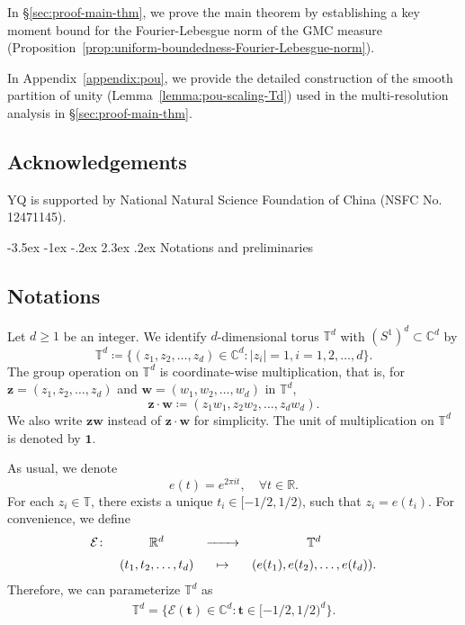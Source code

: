 \documentclass[12pt]{amsart}
\makeatletter
\theoremstyle{definition}
\theoremstyle{remark}
\newcommand{\bt}{\boldsymbol{t}}
\newcommand{\bz}{\boldsymbol{z}}
\newcommand{\bw}{\boldsymbol{w}}
\newcommand{\R}{\mathbb{R}}
\newcommand{\C}{\mathbb{C}}
\newcommand{\T}{\mathbb{T}}
\renewcommand\section{\@startsection{section}{1}{\z@}%
	{-3.5ex \@plus -1ex \@minus -.2ex}%
	{2.3ex \@plus.2ex}%
	{\normalfont\large\bfseries}}%
\numberwithin{equation}{section}
\makeatother
\begin{document}
In \S\ref{sec:proof-main-thm}, we prove the main theorem by establishing a key moment bound for the Fourier-Lebesgue norm of the GMC measure (Proposition~\ref{prop:uniform-boundedness-Fourier-Lebesgue-norm}). 

In Appendix~\ref{appendix:pou}, we provide the detailed construction of the smooth partition of unity (Lemma~\ref{lemma:pou-scaling-Td}) used in the multi-resolution analysis in \S\ref{sec:proof-main-thm}.

\subsection*{Acknowledgements}  YQ is supported by National Natural Science Foundation of China (NSFC No. 12471145). 


\section{Notations and preliminaries}\label{sec:notations-preliminaries}

\subsection{Notations}

Let $d\ge 1$ be an integer. We identify $d$-dimensional torus $\T^d$ with $(S^1)^d\subset \mathbb{C}^d$ by
\[
\T^d\coloneq\{(z_1,z_2,\ldots,z_d)\in \C^d:|z_i|=1,i=1,2,\ldots,d\}.
\]
The group operation on $\T^d$ is coordinate-wise multiplication, that is, for $\bz=(z_1,z_2,\ldots,z_d)$ and $\bw=(w_1,w_2,\ldots,w_d)$ in $\T^d$, 
\[
\bz\cdot \bw\coloneq (z_1w_1,z_2w_2,\ldots,z_d w_d).
\]
We also write $\bz\bw$ instead of $\bz\cdot \bw$ for simplicity. The unit of multiplication on $\T^d$ is denoted by $\boldsymbol{1}$.


As usual, we denote
\[
e(t)=e^{2\pi i t},\quad \forall t\in \R.
\]
For each $z_i\in \T$, there exists a unique $t_i\in [-1/2,1/2)$, such that $z_i=e(t_i)$. For convenience, we define
\begin{align*}
\begin{array}{cccc}
\mathcal{E}\colon & \R^d& \xrightarrow{\quad\quad} & \T^d
\vspace{2mm}
\\
& (t_1,t_2,\ldots,t_d) & \mapsto& (e(t_1),e(t_2),\ldots,e(t_d)).
\end{array}
\end{align*}
Therefore, we can parameterize $\T^d$ as
\begin{align}\label{Td-para}
\T^d=\big\{\mathcal{E}(\bt)\in \C^d:\bt\in [-1/2,1/2)^d\big\}.
\end{align}
\end{document}

